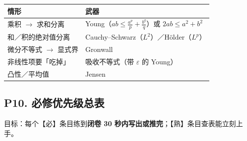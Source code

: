 \begin{center}
\begin{tabular}{L{6.4cm}L{8.2cm}}
\toprule
\textbf{情形} & \textbf{武器} \\
\midrule
乘积 $\to$ 求和分离 & Young（$ab\le\frac{a^p}{p}+\frac{b^q}{q}$）或 $2ab\le a^2+b^2$ \\
和／积的绝对值分离 & Cauchy--Schwarz（$L^2$）／Hölder（$L^p$） \\
微分不等式 $\to$ 显式界 & Gronwall \\
非线性项要「吃掉」 & 吸收不等式（带 $\varepsilon$ 的 Young） \\
凸性／平均值 & Jensen \\
\bottomrule
\end{tabular}
\end{center}

\subsection{P10. 必修优先级总表}

目标：每个【必】条目练到\textbf{闭卷 30 秒内写出或推完}；【熟】条目查表能立刻上手。

